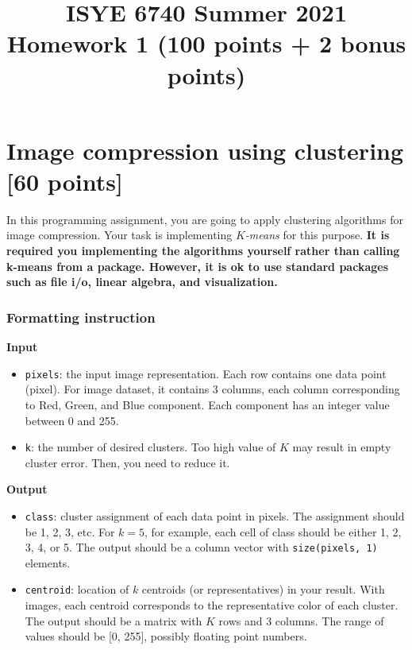 \documentclass[twoside,10pt]{article}
\begin{document}
\title{ISYE 6740 Summer 2021\\ Homework 1 (100 points + 2 bonus points)}
\date{}

\maketitle

\vspace{-.5in}



\section{Image compression using clustering [60 points]}

In this programming assignment, you are going to apply clustering algorithms for image compression. Your task is implementing \emph{$K$-means} for this purpose.  {\bf It is required you implementing the algorithms yourself rather than calling k-means from a package. However, it is ok to use standard packages such as file i/o,  linear algebra, and visualization.} 


\subsubsection*{Formatting instruction}


\textbf{Input}
\begin{itemize}
  \item \texttt{pixels}: the input image representation. Each row contains one data point (pixel). For image dataset, it contains 3 columns, each column corresponding to Red, Green, and Blue component. Each component has an integer value between 0 and 255.
  \item \texttt{k}: the number of desired clusters. Too high value of $K$ may result in empty cluster error. Then, you need to reduce it.
\end{itemize}

\textbf{Output}
\begin{itemize}
  \item \texttt{class}: cluster assignment of each data point in pixels. The assignment should be 1, 2, 3, etc. For $k = 5$, for example, each cell of class should be either 1, 2, 3, 4, or 5. The output should be a column vector with \texttt{size(pixels, 1)} elements.
  \item \texttt{centroid}: location of $k$ centroids (or representatives) in your result. With images, each centroid corresponds to the representative color of each cluster. The output should be a matrix with $K$ rows and 3 columns. The range of values should be [0, 255], possibly floating point numbers.
\end{itemize}
\end{document}
